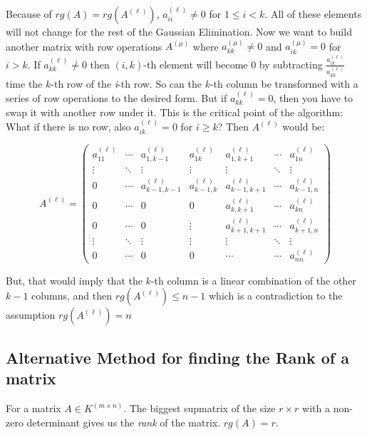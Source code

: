 Because of \(rg(A) = rg(A^{(\ell)})\), \(a^{(\ell)}_{ii} \ne 0\) for \(1 \le i < k\). All of these 
elements will not change for the rest of the Gaussian Elimination. Now we want to build another matrix 
with row operations \(A^{(\mu)}\) where \(a^{(\mu)}_{kk} \ne 0\) and \(a^{(\mu)}_{ik} = 0\) for 
\(i > k\). If \(a^{(\ell)}_{kk} \ne 0\) then \((i,k)\)-th element will become 0 by subtracting 
\(\frac{a^{(\ell)}_{ik}}{a^{(\ell)}_{kk}}\) time the \(k\)-th row of the \emph{i}-th row. So can the \(k\)-th 
column be transformed with a series of row operations to the desired form. But if \(a^{(\ell)}_{kk} = 0\), 
then you have to swap it with another row under it. This is the critical point of the algorithm: What 
if there is no row, also \(a^{(\ell)}_{ik} = 0\) for \(i \ge k\)? Then \(A^{(\ell)}\) would be:

\[
	A^{(\ell)} =
	\begin{pmatrix}
	a^{(\ell)}_{11} & \cdots & a^{(\ell)}_{1,k-1} & a^{(\ell)}_{1k} & a^{(\ell)}_{1,k+1} & \cdots & a^{(\ell)}_{1n} \\
	\vdots & \ddots & \vdots & \vdots & \vdots & \ddots & \vdots \\
	0 & \cdots & a^{(\ell)}_{k-1,k-1} & a^{(\ell)}_{k-1,k} & a^{(\ell)}_{k-1,k+1} & \cdots & a^{(\ell)}_{k-1,n} \\
	0 & \cdots & 0 & 0 & a^{(\ell)}_{k,k+1} & \cdots & a^{(\ell)}_{kn} \\
	0 & \cdots & 0 & \vdots & a^{(\ell)}_{k+1,k+1} & \cdots & a^{(\ell)}_{k+1,n} \\
	\vdots & \ddots & \vdots & \vdots & \vdots & \ddots & \vdots \\
	0 & \cdots & 0 & 0 & \cdots & \cdots & a^{(\ell)}_{nn}
	\end{pmatrix}
\]

But, that would imply that the \(k\)-th column is a linear combination of the other \(k - 1\) columns, 
and then \(rg(A^{(\ell)}) \le n - 1\) which is a contradiction to the assumption  \(rg(A^{(\ell)}) = n\) 

\QED

\subsection{Alternative Method for finding the Rank of a matrix}

For a matrix \(A \in K^{(m \times n)}\). The biggest supmatrix of the size \(r \times r\) with a 
non-zero determinant gives us the \emph{rank} of the matrix. \(rg(A) = r\).

